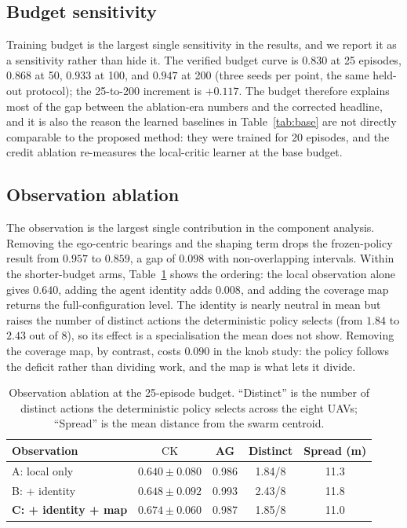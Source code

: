 \documentclass[conference]{IEEEtran}
\newcommand{\ck}{\mathrm{CK}}
\begin{document}
\subsection{Budget sensitivity}
Training budget is the largest single sensitivity in the results, and we report it as a sensitivity rather than hide it. The verified budget curve is $0.830$ at 25 episodes, $0.868$ at 50, $0.933$ at 100, and $0.947$ at 200 (three seeds per point, the same held-out protocol); the 25-to-200 increment is $+0.117$. The budget therefore explains most of the gap between the ablation-era numbers and the corrected headline, and it is also the reason the learned baselines in Table~\ref{tab:base} are not directly comparable to the proposed method: they were trained for 20 episodes, and the credit ablation re-measures the local-critic learner at the base budget.

\subsection{Observation ablation}
The observation is the largest single contribution in the component analysis. Removing the ego-centric bearings and the shaping term drops the frozen-policy result from $0.957$ to $0.859$, a gap of $0.098$ with non-overlapping intervals. Within the shorter-budget arms, Table~\ref{tab:obs} shows the ordering: the local observation alone gives $0.640$, adding the agent identity adds $0.008$, and adding the coverage map returns the full-configuration level. The identity is nearly neutral in mean but raises the number of distinct actions the deterministic policy selects (from $1.84$ to $2.43$ out of $8$), so its effect is a specialisation the mean does not show. Removing the coverage map, by contrast, costs $0.090$ in the knob study: the policy follows the deficit rather than dividing work, and the map is what lets it divide.

\begin{table}[t]
\caption{Observation ablation at the 25-episode budget. ``Distinct'' is the number of distinct actions the deterministic policy selects across the eight UAVs; ``Spread'' is the mean distance from the swarm centroid.}
\label{tab:obs}
\centering
\small
\setlength{\tabcolsep}{3pt}
\begin{tabular}{@{}lcccc@{}}
\toprule
Observation & $\ck$ & AG & Distinct & Spread (m) \\
\midrule
A: local only & $0.640\pm0.080$ & 0.986 & 1.84/8 & 11.3 \\
B: + identity & $0.648\pm0.092$ & 0.993 & 2.43/8 & 11.8 \\
\textbf{C: + identity + map} & $\mathbf{0.674\pm0.060}$ & 0.987 & 1.85/8 & 11.0 \\
\bottomrule
\end{tabular}
\end{table}
\end{document}
